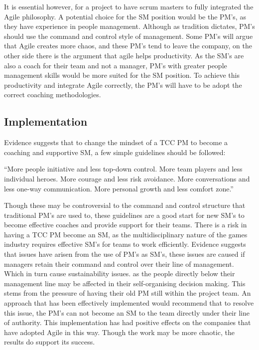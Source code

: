 \documentclass{scrartcl}
\begin{document}
It is essential however, for a project to have scrum masters to fully integrated the Agile philosophy\cite{Together}. A potential choice for the SM position would be the PM's, as they have experience in people management. Although as tradition dictates, PM's should use the command and control style of management\cite{ManagerMaster}. Some PM's will argue that Agile creates more chaos, and these PM's tend to leave the company\cite{Together,ready}, on the other side there is the argument that agile helps productivity. As the SM's are also a coach for their team and not a manager, PM's with greater people management skills would be more suited for the SM position\cite{Together}. To achieve this productivity and integrate Agile correctly, the PM's will have to be adopt the correct coaching methodologies.

\subsection{Implementation}

 Evidence suggests that to change the mindset of a TCC PM to become a coaching and supportive SM, a few simple guidelines should be followed:
 \begin{center}
 	``More people initiative and less top-down control.
 	\newline
 	More team players and less individual heroes.
 	\newline
 	More courage and less risk avoidance.
 	\newline
 	More conversations and less one-way communication.
 	\newline
 	More personal growth and less comfort zone\cite{AdoptAgile}.''
 	\newline
 \end{center}

 Though these may be controversial to the command and control structure that traditional PM's are used to, these guidelines are a good start for new SM's to become effective coaches and provide support for their teams\cite{Leader,AdoptAgile}. There is a risk in having a TCC PM become an SM, as the multidisciplinary nature of the games industry requires effective SM's for teams to work efficiently. Evidence suggests that issues have arisen from the use of PM's as SM's, these issues are caused if managers retain their command and control over their line of management. Which in turn cause sustainability issues\cite{Together,Oxymoron}. as the people directly below their management line may be affected in their self-organising decision making. This stems from the pressure of having their old PM still within the project team\cite{ManagerMaster}. An approach that has been effectively implemented would recommend that to resolve this issue, the PM's can not become an SM to the team directly under their line of authority\cite{ManagerMaster,Together}. This implementation has had positive effects on the companies that have adopted Agile in this way. Though the work may be more chaotic\cite{Chaos}, the results do support its success\cite{LeaderUnleashed,Together}. 
 
\end{document}
